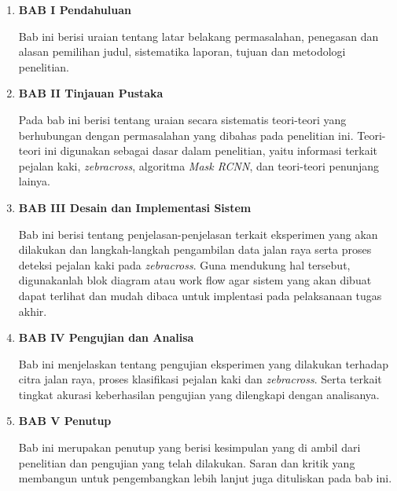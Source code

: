 \begin{enumerate}[nolistsep]

  \item \textbf{BAB I Pendahuluan}

  Bab ini berisi uraian tentang latar belakang permasalahan, penegasan dan alasan pemilihan judul, sistematika laporan, tujuan dan metodologi penelitian.

  \vspace{2ex}

  \item \textbf{BAB II Tinjauan Pustaka}

  Pada bab ini berisi tentang uraian secara sistematis teori-teori yang berhubungan dengan permasalahan yang dibahas pada penelitian ini. Teori-teori ini digunakan sebagai dasar dalam penelitian, yaitu informasi terkait pejalan kaki, \textit{zebracross}, algoritma \textit{Mask RCNN}, dan teori-teori penunjang lainya.

  \vspace{2ex}

  \item \textbf{BAB III Desain dan Implementasi Sistem}

  Bab ini berisi tentang penjelasan-penjelasan terkait eksperimen yang akan dilakukan dan langkah-langkah pengambilan data jalan raya serta proses deteksi pejalan kaki pada \textit{zebracross}. Guna mendukung hal tersebut, digunakanlah blok diagram atau work flow agar sistem yang akan dibuat dapat terlihat dan mudah dibaca untuk implentasi pada pelaksanaan tugas akhir.

  \vspace{2ex}

  \item \textbf{BAB IV Pengujian dan Analisa}

  Bab ini menjelaskan tentang pengujian eksperimen yang dilakukan terhadap citra jalan raya, proses klasifikasi pejalan kaki dan \textit{zebracross}. Serta terkait tingkat akurasi keberhasilan pengujian yang dilengkapi dengan analisanya.

  \vspace{2ex}

  \item \textbf{BAB V Penutup}

  Bab ini merupakan penutup yang berisi kesimpulan yang di ambil dari penelitian dan pengujian yang telah dilakukan. Saran dan kritik yang membangun untuk pengembangkan lebih lanjut juga dituliskan pada bab ini.

\end{enumerate}
